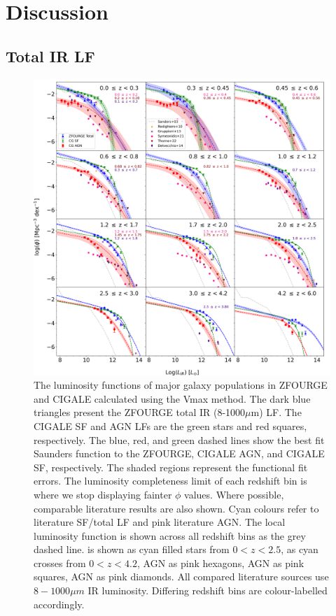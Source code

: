 \section{Discussion} \label{Sec: Discussion}
\subsection{Total IR LF} \label{Sec: Bolometric IR LF}

\begin{figure}
    \centering
    \includegraphics[width=\textwidth]{Figures/LF.png}
    \caption{The luminosity functions of major galaxy populations in ZFOURGE and CIGALE calculated using the Vmax method. The dark blue triangles present the ZFOURGE total IR (8-1000$\mu$m) LF. The CIGALE SF and AGN LFs are the green stars and red squares, respectively. The blue, red, and green dashed lines show the best fit Saunders function \citep{saunders_60-mum_1990} to the ZFOURGE, CIGALE AGN, and CIGALE SF, respectively. The shaded regions represent the functional fit errors. The luminosity completeness limit of each redshift bin is where we stop displaying fainter $\phi$ values. Where possible, comparable literature results are also shown. Cyan colours refer to literature SF/total LF and pink literature AGN. The local \cite{sanders_iras_2003} luminosity function is shown across all redshift bins as the grey dashed line. \cite{rodighiero_mid-_2010} is shown as cyan filled stars from $0 < z < 2.5$, \cite{gruppioni_herschel_2013} as cyan crosses from $0 < z < 4.2$, \cite{symeonidis_agn_2021} AGN as pink hexagons, \cite{thorne_deep_2022} AGN as pink squares, \cite{delvecchio_tracing_2014} AGN as pink diamonds. All compared literature sources use $8-1000 \mu m$ IR luminosity. Differing redshift bins are colour-labelled accordingly.}
    \label{Fig: Bolometric IR LF}
\end{figure}

